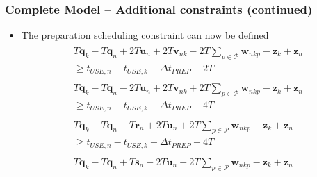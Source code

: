 \documentclass{beamer}
\begin{document}
\begin{frame}
    \frametitle{Complete Model -- Additional constraints (continued)}
    \begin{itemize}
    \item The preparation scheduling constraint can now be defined
    \begin{equation}
            \begin{split}
                \begin{aligned}
                    T \boldsymbol{q}_{k} - T \boldsymbol{q}_{n}
                    + 2T \boldsymbol{u}_{n} + 2T \boldsymbol{v}_{nk}
                    - 2T \sum_{p \in \mathcal{P}} \boldsymbol{w}_{nkp} 
                    - \boldsymbol{z}_{k} + \boldsymbol{z}_{n}\\
                    \ge t_{\mathit{USE},n} - t_{\mathit{USE},k}
                    + \Delta t_{\mathit{PREP}} - 2T
                \end{aligned}\\
                \begin{aligned}
                    T \boldsymbol{q}_{k} - T \boldsymbol{q}_{n}
                    - 2T \boldsymbol{u}_{n} + 2T \boldsymbol{v}_{nk}
                    + 2T \sum_{p \in \mathcal{P}} \boldsymbol{w}_{nkp} 
                    - \boldsymbol{z}_{k} + \boldsymbol{z}_{n}\\
                    \ge t_{\mathit{USE},n} - t_{\mathit{USE},k}
                    - \Delta t_{\mathit{PREP}} + 4T
                \end{aligned}\\
                \begin{aligned}
                    T \boldsymbol{q}_{k} - T \boldsymbol{q}_{n}
                    - T \boldsymbol{r}_{n} + 2T \boldsymbol{u}_{n}
                    + 2T \sum_{p \in \mathcal{P}} \boldsymbol{w}_{nkp} 
                    - \boldsymbol{z}_{k} + \boldsymbol{z}_{n}\\
                    \ge t_{\mathit{USE},n} - t_{\mathit{USE},k}
                    - \Delta t_{\mathit{PREP}} + 4T
                \end{aligned}\\
                \begin{aligned}
                    T \boldsymbol{q}_{k} - T \boldsymbol{q}_{n}
                    + T \boldsymbol{s}_{n} - 2T \boldsymbol{u}_{n}
                    - 2T \sum_{p \in \mathcal{P}} \boldsymbol{w}_{nkp} 
                    - \boldsymbol{z}_{k} + \boldsymbol{z}_{n}\\

\end{aligned}
\end{split}
\end{equation}
\end{itemize}
\end{frame}
\end{document}
